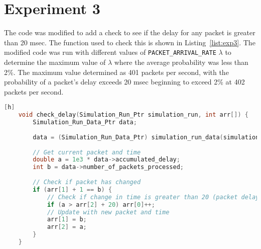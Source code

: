 \section*{Experiment 3}

The code was modified to add a check to see if the delay for any packet is greater than 20 msec. The function used to check this is shown in Listing~\ref{list:exp3}. The modified code was run with different values of \texttt{PACKET\_ARRIVAL\_RATE} $\lambda$ to determine the maximum value of $\lambda$ where the average probability was less than 2\%. The maximum value determined as 401 packets per second, with the probability of a packet's delay exceeds 20 msec beginning to exceed 2\% at 402 packets per second.

\begin{lstlisting}[gobble=8, language=C, caption={Modifications to Experiment 3 Code}, label={list:exp3}][h]
	void check_delay(Simulation_Run_Ptr simulation_run, int arr[]) {
		Simulation_Run_Data_Ptr data;
	
		data = (Simulation_Run_Data_Ptr) simulation_run_data(simulation_run);
	
		// Get current packet and time
		double a = 1e3 * data->accumulated_delay;
		int b = data->number_of_packets_processed;
	
		// Check if packet has changed
		if (arr[1] + 1 == b) {
			// Check if change in time is greater than 20 (packet delay > 20 msec)
			if (a > arr[2] + 20) arr[0]++;
			// Update with new packet and time
			arr[1] = b;
			arr[2] = a;
		}
	}
\end{lstlisting}